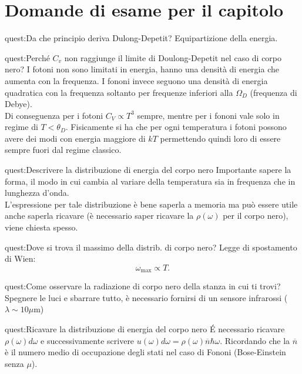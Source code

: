 \clearpage 
\section*{Domande di esame per il capitolo}%
\begin{quest}{quest:Da che principio deriva Dulong-Depetit?}
Equipartizione della energia.
\end{quest}
\begin{quest}{quest:Perché $C_v$ non raggiunge il limite di Doulong-Depetit nel caso di corpo nero?}
    I fotoni non sono limitati in energia, hanno una densità di energia che aumenta con la frequenza. 
    I fononi invece seguono una densità di energia quadratica con la frequenza soltanto per frequenze inferiori alla $\Omega_D$ (frequenza di Debye).\\
    Di conseguenza per i fotoni $C_V\propto T^3$ sempre, mentre per i fononi vale solo in regime di $T<\theta_D$. Fisicamente si ha che per ogni temperatura i fotoni possono avere dei modi con energia maggiore di $kT$ permettendo quindi loro di essere sempre fuori dal regime classico.
\end{quest}
\begin{quest}{quest:Descrivere la distribuzione di energia del corpo nero}
Importante sapere la forma, il modo in cui cambia al variare della temperatura sia in frequenza che in lunghezza d'onda.\\
L'espressione per tale distribuzione è bene saperla a memoria ma può essere utile anche saperla ricavare (è necessario saper ricavare la $\rho(\omega)$ per il corpo nero), viene chiesta spesso.
\end{quest}
\begin{quest}{quest:Dove si trova il massimo della distrib. di corpo nero?}
Legge di spostamento di Wien:
\[
    \omega_{\text{max}} \propto T
.\] 
\end{quest}
\begin{quest}{quest:Come osservare la radiazione di corpo nero della stanza in cui ti trovi?}
    Spegnere le luci e sbarrare tutto, è necessario fornirsi di un sensore infrarossi ($\lambda\sim 10 \mu$m) 
\end{quest}
\begin{quest}{quest:Ricavare la distribuzione di energia del corpo nero}
    É necessario ricavare $\rho (\omega) d\omega$ e successivamente scrivere $u(\omega) d\omega  = \rho (\omega) \overline{n}\hbar \omega$. Ricordando che la $\overline{n} $ è il numero medio di occupazione degli stati nel caso di Fononi (Bose-Einstein senza $\mu$).
\end{quest}
